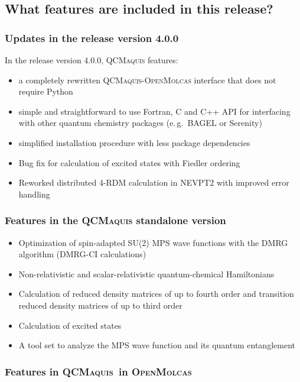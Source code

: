 \documentclass[bibliography=totoc,12pt,a4paper]{scrartcl}
\newcommand{\relv}{release version 4.0.0}
\newcommand{\mol}{\textsc{OpenMolcas}}
\newcommand{\qcm}{\textsc{QCMaquis}}
\begin{document}
\subsection{What features are included in this release?}
\label{sec:features-v1.0}

\subsubsection{Updates in the \relv}
In the \relv, \qcm{} features:
\begin{itemize}
  \item a completely rewritten \qcm{}-\mol{} interface that does not require Python
  \item simple and straightforward to use Fortran, C and C++ API for interfacing with other quantum chemistry packages (e.\,g.\ BAGEL or Serenity)
  \item simplified installation procedure with less package dependencies
  \item Bug fix for calculation of excited states with Fiedler ordering
  \item Reworked distributed 4-RDM calculation in NEVPT2 with improved error handling
\end{itemize}

\subsubsection{Features in the \qcm{} standalone version}\label{sec:features-stand}

\begin{itemize}
	\item Optimization of spin-adapted SU(2) MPS wave functions with the DMRG algorithm (DMRG-CI calculations)
	\item Non-relativistic and scalar-relativistic quantum-chemical Hamiltonians
	\item Calculation of reduced density matrices of up to fourth order and transition reduced density matrices of up to third order
	\item Calculation of excited states
	\item A tool set to analyze the MPS wave function and its quantum entanglement
\end{itemize}

\subsubsection{Features in  \qcm\ in \mol}\label{sec:features-qcm-mol}
\end{document}
